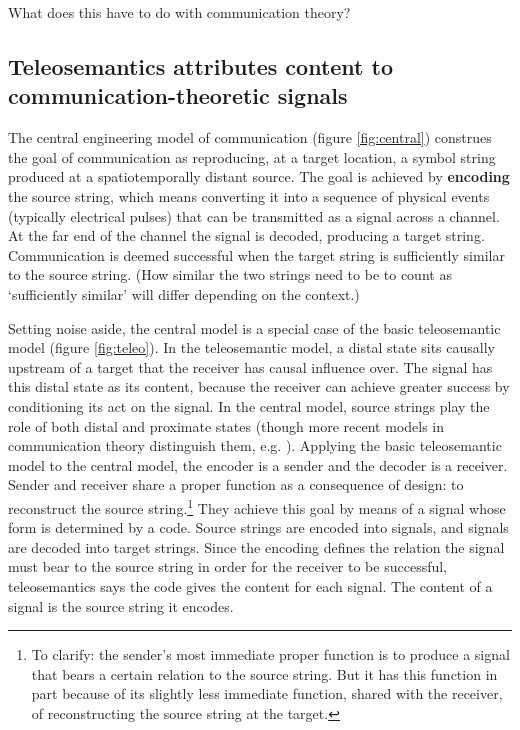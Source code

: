 \documentclass[12pt]{article}
\begin{document}
What does this have to do with communication theory?

\subsection{Teleosemantics attributes content to communication-theoretic signals}


The central engineering model of communication (figure \ref{fig:central}) construes the goal of communication as reproducing, at a target location, a symbol string produced at a spatiotemporally distant source.
The goal is achieved by \textbf{encoding} the source string, which means converting it into a sequence of physical events (typically electrical pulses) that can be transmitted as a signal across a channel.
At the far end of the channel the signal is decoded, producing a target string.
Communication is deemed successful when the target string is sufficiently similar to the source string.
(How similar the two strings need to be to count as `sufficiently similar' will differ depending on the context.)




Setting noise aside, the central model is a special case of the basic teleosemantic model (figure \ref{fig:teleo}).
%
In the teleosemantic model, a distal state sits causally upstream of a target that the receiver has causal influence over.
The signal has this distal state as its content, because the receiver can achieve greater success by conditioning its act on the signal.
In the central model, source strings play the role of both distal and proximate states (though more recent models in communication theory distinguish them, e.g. \citet{berger1996ceo}).
Applying the basic teleosemantic model to the central model, the encoder is a sender and the decoder is a receiver.
Sender and receiver share a proper function as a consequence of design: to reconstruct the source string.\footnote{To clarify: the sender's most immediate proper function is to produce a signal that bears a certain relation to the source string. But it has this function in part because of its slightly less immediate function, shared with the receiver, of reconstructing the source string at the target.}
They achieve this goal by means of a signal whose form is determined by a code.
Source strings are encoded into signals, and signals are decoded into target strings.
Since the encoding defines the relation the signal must bear to the source string in order for the receiver to be successful, teleosemantics says the code gives the content for each signal.
The content of a signal is the source string it encodes.
\end{document}
